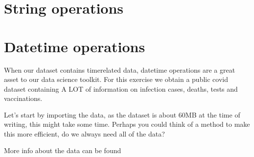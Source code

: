 \documentclass[letterpaper,10pt,english]{jupyterBook}
\begin{document}
\chapter{String operations}
\label{\detokenize{c2_data_preparation/string_operations:string-operations}}\label{\detokenize{c2_data_preparation/string_operations::doc}}

\chapter{Datetime operations}
\label{\detokenize{c2_data_preparation/datetime_operations:datetime-operations}}\label{\detokenize{c2_data_preparation/datetime_operations::doc}}
\sphinxAtStartPar
When our dataset contains time\sphinxhyphen{}related data, datetime operations are a great asset to our data science toolkit.
For this exercise we obtain a public covid dataset containing A LOT of information on infection cases, deaths, tests and vaccinations.

\sphinxAtStartPar
Let’s start by importing the data, as the dataset is about 60MB at the time of writing, this might take some time.
Perhaps you could think of a method to make this more efficient, do we always need all of the data?

\sphinxAtStartPar
More info about the data can be found 

\begin{sphinxVerbatim}[commandchars=\\\{\}]
   
\end{sphinxVerbatim}

\begin{sphinxVerbatim}[commandchars=\\\{\}]
   
\end{sphinxVerbatim}
\end{document}

